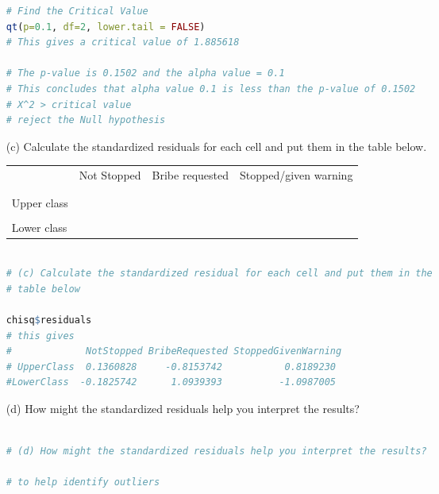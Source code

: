 \documentclass[12pt,letterpaper]{article}
\begin{document}
\begin{enumerate}
\begin{lstlisting}[language=R]
# Find the Critical Value
qt(p=0.1, df=2, lower.tail = FALSE)
# This gives a critical value of 1.885618

# The p-value is 0.1502 and the alpha value = 0.1
# This concludes that alpha value 0.1 is less than the p-value of 0.1502
# X^2 > critical value 
# reject the Null hypothesis

\end{lstlisting}
	
	\newpage
	\item [(c)] Calculate the standardized residuals for each cell and put them in the table below.
	\vspace{1cm}
	
	\begin{table}[h]
		\centering
		\begin{tabular}{l | c c c }
			& Not Stopped & Bribe requested & Stopped/given warning \\
			\\[-1.8ex] 
			\hline \\[-1.8ex]
			Upper class  &  &  &  \\
			\\
			Lower class &  &   &   \\
			
		\end{tabular}
	\end{table}
	
	
	\vspace{2cm}
	
			\begin{lstlisting}[language=R]

# (c) Calculate the standardized residual for each cell and put them in the
# table below

chisq$residuals
# this gives
#             NotStopped BribeRequested StoppedGivenWarning
# UpperClass  0.1360828     -0.8153742           0.8189230
#LowerClass  -0.1825742      1.0939393          -1.0987005

\end{lstlisting}
	
	\item [(d)] How might the standardized residuals help you interpret the results?  
	
		\begin{lstlisting}[language=R]

# (d) How might the standardized residuals help you interpret the results?

# to help identify outliers 

\end{lstlisting}
	
	
	
\end{enumerate}
\newpage
\end{document}
